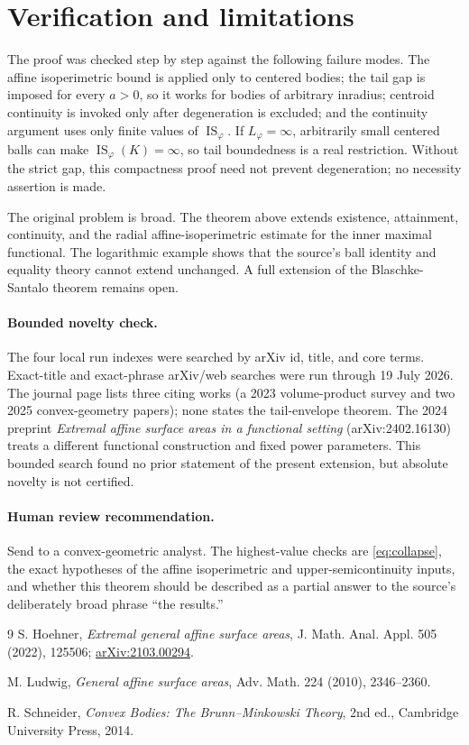 \documentclass[11pt]{article}
\newcommand{\IS}{\operatorname{IS}}
\begin{document}
\section{Verification and limitations}

The proof was checked step by step against the following failure modes.
The affine isoperimetric bound is applied only to centered bodies; the tail
gap is imposed for every $a>0$, so it works for bodies of arbitrary inradius;
centroid continuity is invoked only after degeneration is excluded; and the
continuity argument uses only finite values of $\IS_\varphi$.  If
$L_\varphi=\infty$, arbitrarily small centered balls can make
$\IS_\varphi(K)=\infty$, so tail boundedness is a real restriction.  Without
the strict gap, this compactness proof need not prevent degeneration; no
necessity assertion is made.

The original problem is broad.  The theorem above extends existence,
attainment, continuity, and the radial affine-isoperimetric estimate for the
inner maximal functional.  The logarithmic example shows that the source's
ball identity and equality theory cannot extend unchanged.  A full extension
of the Blaschke-Santalo theorem remains open.

\paragraph{Bounded novelty check.}
The four local run indexes were searched by arXiv id, title, and core terms.
Exact-title and exact-phrase arXiv/web searches were run through 19 July 2026.
The journal page lists three citing works (a 2023 volume-product survey and two
2025 convex-geometry papers); none states the tail-envelope theorem.  The 2024
preprint \emph{Extremal affine surface areas in a functional setting}
(arXiv:2402.16130) treats a different functional construction and fixed power
parameters.  This bounded search found no prior statement of the present
extension, but absolute novelty is not certified.

\paragraph{Human review recommendation.}
Send to a convex-geometric analyst.  The highest-value checks are
\eqref{eq:collapse}, the exact hypotheses of the affine isoperimetric and
upper-semicontinuity inputs, and whether this theorem should be described as a
partial answer to the source's deliberately broad phrase ``the results.''

\begin{thebibliography}{9}
S. Hoehner,
\emph{Extremal general affine surface areas},
J. Math. Anal. Appl. 505 (2022), 125506;
\href{https://arxiv.org/abs/2103.00294}{arXiv:2103.00294}.

M. Ludwig,
\emph{General affine surface areas},
Adv. Math. 224 (2010), 2346--2360.

R. Schneider,
\emph{Convex Bodies: The Brunn--Minkowski Theory},
2nd ed., Cambridge University Press, 2014.
\end{thebibliography}
\end{document}
